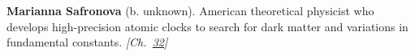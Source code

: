 \textbf{Marianna Safronova} (b. unknown). American theoretical physicist who develops high-precision atomic clocks to search for dark matter and variations in fundamental constants. \emph{[Ch.~\hyperref[ch:atomic]{32}]}

